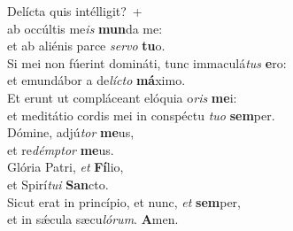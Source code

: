 \oddverse Delícta quis intélligit?~+\\
\oddverse  ab occúltis me\textit{is} \textbf{mun}da me:~\*\\
\oddverse et ab aliénis parce \textit{ser}\textit{vo} \textbf{tu}o.\\
\evenverse Si mei non fúerint domináti, tunc immaculá\textit{tus} \textbf{e}ro:~\*\\
\evenverse et emundábor a de\textit{lí}\textit{cto} \textbf{má}ximo.\\
\oddverse Et erunt ut compláceant elóquia o\textit{ris} \textbf{me}i:~\*\\
\oddverse et meditátio cordis mei in conspéctu \textit{tu}\textit{o} \textbf{sem}per.\\
\evenverse Dómine, adjú\textit{tor} \textbf{me}us,~\*\\
\evenverse et re\textit{dém}\textit{ptor} \textbf{me}us.\\
\oddverse Glória Patri, \textit{et} \textbf{Fí}lio,~\*\\
\oddverse et Spirí\textit{tu}\textit{i} \textbf{San}cto.\\
\evenverse Sicut erat in princípio, et nunc, \textit{et} \textbf{sem}per,~\*\\
\evenverse et in sǽcula sæcu\textit{ló}\textit{rum}. \textbf{A}men.\\
